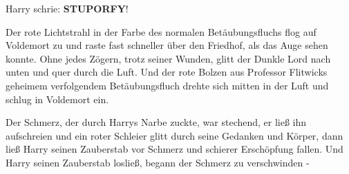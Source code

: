 Harry schrie: \glqq{}\textbf{STUPORFY}!\grqq{}

Der rote Lichtstrahl in der Farbe des normalen Betäubungsfluchs flog auf
Voldemort zu und raste fast schneller über den Friedhof, als das Auge sehen
konnte. Ohne jedes Zögern, trotz seiner Wunden, glitt der Dunkle Lord nach unten
und quer durch die Luft. Und der rote Bolzen aus Professor Flitwicks geheimem
verfolgendem Betäubungsfluch drehte sich mitten in der Luft und schlug in
Voldemort ein.

Der Schmerz, der durch Harrys Narbe zuckte, war stechend, er ließ ihn
aufschreien und ein roter Schleier glitt durch seine Gedanken und Körper, dann
ließ Harry seinen Zauberstab vor Schmerz und schierer Erschöpfung fallen. Und
Harry seinen Zauberstab losließ, begann der Schmerz zu verschwinden -

